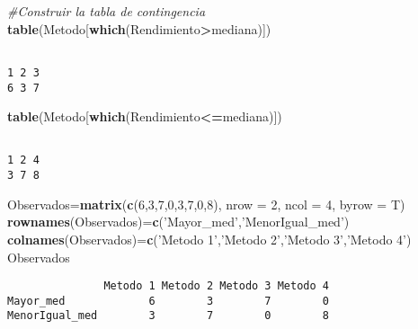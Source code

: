 \documentclass[a4paper,oneside,openany]{book}
\newenvironment{Shaded}{\begin{snugshade}}{\end{snugshade}}
\newcommand{\KeywordTok}[1]{\textcolor[rgb]{0.13,0.29,0.53}{\textbf{#1}}}
\newcommand{\DataTypeTok}[1]{\textcolor[rgb]{0.13,0.29,0.53}{#1}}
\newcommand{\DecValTok}[1]{\textcolor[rgb]{0.00,0.00,0.81}{#1}}
\newcommand{\StringTok}[1]{\textcolor[rgb]{0.31,0.60,0.02}{#1}}
\newcommand{\CommentTok}[1]{\textcolor[rgb]{0.56,0.35,0.01}{\textit{#1}}}
\newcommand{\OperatorTok}[1]{\textcolor[rgb]{0.81,0.36,0.00}{\textbf{#1}}}
\newcommand{\NormalTok}[1]{#1}
\begin{document}
\begin{Shaded}
\begin{Highlighting}[]
\CommentTok{#Construir la tabla de contingencia}
\KeywordTok{table}\NormalTok{(Metodo[}\KeywordTok{which}\NormalTok{(Rendimiento}\OperatorTok{>}\NormalTok{mediana)])}
\end{Highlighting}
\end{Shaded}

\begin{verbatim}

1 2 3 
6 3 7 
\end{verbatim}

\begin{Shaded}
\begin{Highlighting}[]
\KeywordTok{table}\NormalTok{(Metodo[}\KeywordTok{which}\NormalTok{(Rendimiento}\OperatorTok{<=}\NormalTok{mediana)])}
\end{Highlighting}
\end{Shaded}

\begin{verbatim}

1 2 4 
3 7 8 
\end{verbatim}

\begin{Shaded}
\begin{Highlighting}[]
\NormalTok{Observados=}\KeywordTok{matrix}\NormalTok{(}\KeywordTok{c}\NormalTok{(}\DecValTok{6}\NormalTok{,}\DecValTok{3}\NormalTok{,}\DecValTok{7}\NormalTok{,}\DecValTok{0}\NormalTok{,}\DecValTok{3}\NormalTok{,}\DecValTok{7}\NormalTok{,}\DecValTok{0}\NormalTok{,}\DecValTok{8}\NormalTok{), }\DataTypeTok{nrow =} \DecValTok{2}\NormalTok{, }\DataTypeTok{ncol =} \DecValTok{4}\NormalTok{, }\DataTypeTok{byrow =}\NormalTok{ T)}
\KeywordTok{rownames}\NormalTok{(Observados)=}\KeywordTok{c}\NormalTok{(}\StringTok{'Mayor_med'}\NormalTok{,}\StringTok{'MenorIgual_med'}\NormalTok{)}
\KeywordTok{colnames}\NormalTok{(Observados)=}\KeywordTok{c}\NormalTok{(}\StringTok{'Metodo 1'}\NormalTok{,}\StringTok{'Metodo 2'}\NormalTok{,}\StringTok{'Metodo 3'}\NormalTok{,}\StringTok{'Metodo 4'}\NormalTok{)}
\NormalTok{Observados}
\end{Highlighting}
\end{Shaded}

\begin{verbatim}
               Metodo 1 Metodo 2 Metodo 3 Metodo 4
Mayor_med             6        3        7        0
MenorIgual_med        3        7        0        8
\end{verbatim}
\end{document}
